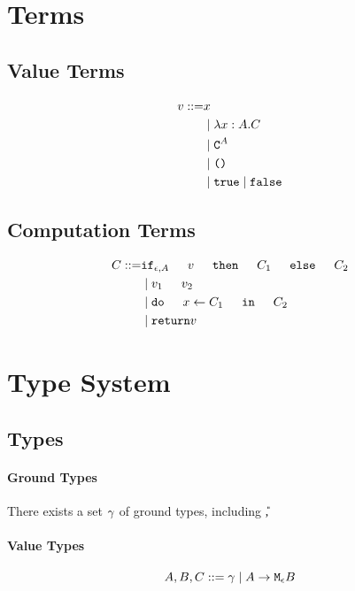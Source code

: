\documentclass{report}
\begin{document}
\section{Terms}
    \subsection{Value Terms}

    \begin{equation}
        \begin{split}
            v ::= & x \\
            & \mid \lambda x : A. C \\
            & \mid \texttt{C}^{A} \\
            & \mid \texttt{()} \\
            & \mid \texttt{true} \mid \texttt{false} \\
        \end{split}
    \end{equation}

    \subsection{Computation Terms}
        \begin{equation}
            \begin{split}
                C \gens & \ifthenelse{\e}{A}{v}{C_1}{C_2} \\
                        & \mid \apply{v_1}{v_2} \\
                        & \mid \doin{x}{C_1}{C_2} \\
                        & \mid \return{v}
            \end{split}
        \end{equation}
 
\section{Type System}
    \subsection{Types}
        \paragraph{Ground Types}
            There exists a set $\gamma$ of ground types, including \U, \B
        \paragraph{Value Types}
        $$ A, B, C ::= \gamma \mid A \rightarrow \texttt{M}_{\epsilon}{B} $$
\end{document}
